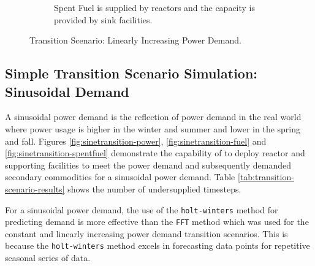 \begin{figure}[]
\begin{subfigure}[t]{0.6\textwidth}
            \caption{Spent Fuel is supplied by reactors and the capacity is provided by sink facilities.}
            \label{fig:growingtransition-spentfuel}
        \end{subfigure}
        \caption{Transition Scenario: Linearly Increasing Power Demand.}
    \end{figure}
    
    \subsection{Simple Transition Scenario Simulation: Sinusoidal Demand}
    A sinusoidal power demand is the reflection of power demand in 
    the real world where power usage is higher in the winter and summer
    and lower in the spring and fall. 
    Figures \ref{fig:sinetransition-power}, \ref{fig:sinetransition-fuel}
    and \ref{fig:sinetransition-spentfuel} demonstrate the capability 
    of \deploy to deploy reactor and supporting facilities to meet the
    power demand and subsequently demanded secondary commodities 
    for a sinusoidal power demand. 
    Table \ref{tab:transition-scenario-results} shows the number of 
    undersupplied timesteps.
    
    For a sinusoidal power demand, the use of the 
    \texttt{holt-winters} method
    for predicting demand is more effective than the 
    \texttt{FFT} method which was used for the constant 
    and linearly increasing power demand transition scenarios. 
    This is because the \texttt{holt-winters} method excels in
    forecasting data points for repetitive seasonal series of data. 
    

